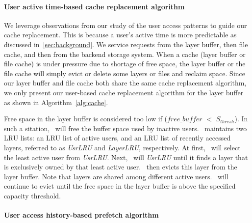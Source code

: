 \paragraph{User active time-based cache replacement algorithm}



We leverage observations from our study of the user access patterns to guide our cache replacement. This is because
a user's active time is more predictable as discussed in~\cref{sec:background}.
We service requests from the layer buffer, then file cache, and then from the backend storage system. 
When a cache (layer buffer or file cache) is under pressure due to 
shortage of free space,
the layer buffer or the file cache will simply evict or delete some layers or files and reclaim space.
Since our layer buffer and file cache both share the same cache replacement algorithm, we only present
our user-based cache replacement algorithm for the layer buffer as shown in Algorithm~\ref{alg:cache}.

Free space in the layer buffer is considered too low if ($free\_buffer$ $<$ $S_{thresh}$). 
In such a sitation, \sysname~will free the buffer space used by inactive users. 
\sysname~maintains two LRU lists: an LRU list of active users, and
an LRU list of recently accessed layers, referred to as \emph{UsrLRU} and \emph{LayerLRU}, respectively.
At first, \sysname~will select the least active user from \emph{UsrLRU}.
Next, \sysname~will  \emph{UsrLRU} until it finds a layer that is exclusively owned by that least active user. 
\sysname~then evicts this layer from the layer buffer. 
 Note that layers are shared among different active users.
 \sysname~will continue to evict until the free space in the layer buffer is above the specified capacity threshold.
 

\paragraph{User access history-based prefetch algorithm}

